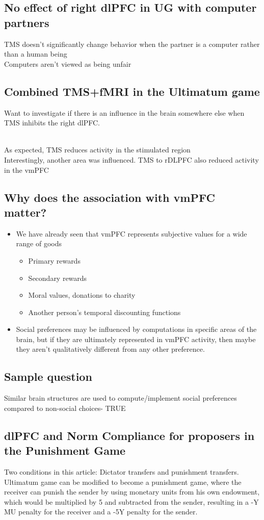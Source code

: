  \subsection{No effect of right dlPFC in UG with computer partners}
 TMS doesn't significantly change behavior when the partner is a computer rather than a human being
 \\Computers aren't viewed as being unfair
 \subsection{Combined TMS+fMRI in the Ultimatum game}
 Want to investigate if there is an influence in the brain somewhere else when TMS inhibits the right dlPFC.

 \\As expected, TMS reduces activity in the stimulated region
 \\Interestingly, another area was influenced. TMS to rDLPFC also reduced activity in the vmPFC
 \subsection{Why does the association with vmPFC matter?}
 \begin{itemize}
     \item We have already seen that vmPFC represents subjective values for a wide range of goods
     \begin{itemize}
         \item Primary rewards
         \item Secondary rewards
         \item Moral values, donations to charity
         \item Another person's temporal discounting functions
     \end{itemize}
     \item Social preferences may be influenced by computations in specific areas of the brain, but if they are ultimately represented in vmPFC activity, then maybe they aren't qualitatively different from any other preference.
 \end{itemize}
 \subsection{Sample question}
 Similar brain structures are used to compute/implement social preferences compared to non-social choices- TRUE
 \subsection{dlPFC and Norm Compliance for proposers in the Punishment Game}
 Two conditions in this article: Dictator transfers and punishment transfers.
 Ultimatum game can be modified to become a punishment game, where the receiver can punish the sender by using monetary units from his own endowment, which would be multiplied by 5 and subtracted from the sender, resulting in a -Y MU penalty for the receiver and a -5Y penalty for the sender.

